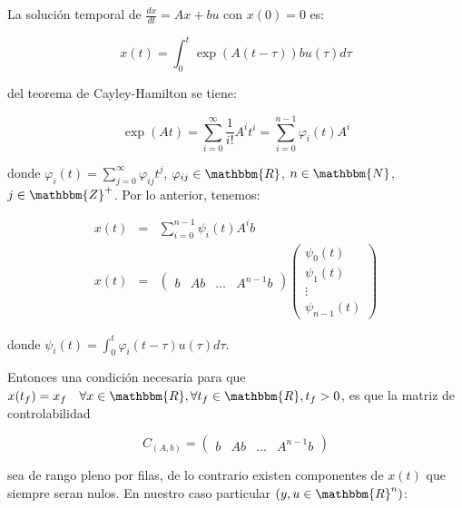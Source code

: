         La solución temporal de $\frac{dx}{dt} = Ax + bu$ con $x(0) = 0$ es:

        \begin{equation}
            x(t) = \int_0^t \exp{(A(t - \tau))} b u(\tau) d \tau
        \end{equation}

        del teorema de Cayley-Hamilton se tiene:

        \begin{equation}
            \exp{(A t)} = \sum\limits_{i=0}^{\infty} \frac{1}{i!} A^i t^i = \sum\limits_{i=0}^{n-1} \varphi_i(t) A^i
        \end{equation}

        donde $\varphi_i(t) = \sum\limits_{j=0}^{\infty} \varphi_{ij} t^j$, $\varphi_{ij} \in \mathbbm{R}$, $n \in \mathbbm{N}$, $j \in \mathbbm{Z}^+$. Por lo anterior, tenemos:

        \begin{eqnarray}
        x(t) & = & \sum\limits_{i=0}^{n-1} \psi_i(t) A^i b \nonumber \\
        x(t) & = &
        \begin{pmatrix}
        b & A b & \dots & A^{n-1} b
        \end{pmatrix}
        \begin{pmatrix}
        \psi_0(t) \\
        \psi_1(t) \\
        \vdots \\
        \psi_{n-1}(t)
        \end{pmatrix}
        \end{eqnarray}

        donde $\psi_i(t) = \int_0^t \varphi_i (t - \tau) u(\tau) d \tau$.

        Entonces una condición necesaria para que $x(t_f) = x_f \quad \forall x \in \mathbbm{R}, \forall t_f \in \mathbbm{R}, t_f > 0$, es que la matriz de controlabilidad

        \begin{equation}
            C_{(A,b)} =
            \begin{pmatrix}
            b & Ab & \dots & A^{n-1}b
            \end{pmatrix}
        \end{equation}

        sea de rango pleno por filas, de lo contrario existen componentes de $x(t)$ que siempre seran nulos. En nuestro caso particular $\left( y, u \in \mathbbm{R}^n \right)$:

